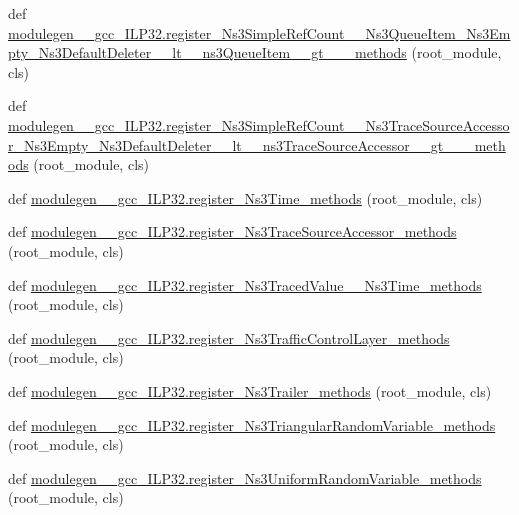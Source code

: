 \begin{DoxyCompactItemize}
\item 
def \hyperlink{namespacemodulegen____gcc__ILP32_a4e8d458b2fa0675e05a5b6c3d3966994}{modulegen\+\_\+\+\_\+gcc\+\_\+\+I\+L\+P32.\+register\+\_\+\+Ns3\+Simple\+Ref\+Count\+\_\+\+\_\+\+Ns3\+Queue\+Item\+\_\+\+Ns3\+Empty\+\_\+\+Ns3\+Default\+Deleter\+\_\+\+\_\+lt\+\_\+\+\_\+ns3\+Queue\+Item\+\_\+\+\_\+gt\+\_\+\+\_\+\+\_\+methods} (root\+\_\+module, cls)
\item 
def \hyperlink{namespacemodulegen____gcc__ILP32_a54ea4c3c62de90cf295c66cffbc336c8}{modulegen\+\_\+\+\_\+gcc\+\_\+\+I\+L\+P32.\+register\+\_\+\+Ns3\+Simple\+Ref\+Count\+\_\+\+\_\+\+Ns3\+Trace\+Source\+Accessor\+\_\+\+Ns3\+Empty\+\_\+\+Ns3\+Default\+Deleter\+\_\+\+\_\+lt\+\_\+\+\_\+ns3\+Trace\+Source\+Accessor\+\_\+\+\_\+gt\+\_\+\+\_\+\+\_\+methods} (root\+\_\+module, cls)
\item 
def \hyperlink{namespacemodulegen____gcc__ILP32_a4bcbbf479533e8b6fb238739668fe36d}{modulegen\+\_\+\+\_\+gcc\+\_\+\+I\+L\+P32.\+register\+\_\+\+Ns3\+Time\+\_\+methods} (root\+\_\+module, cls)
\item 
def \hyperlink{namespacemodulegen____gcc__ILP32_a3451d08858386f1fa04131d165c83ba0}{modulegen\+\_\+\+\_\+gcc\+\_\+\+I\+L\+P32.\+register\+\_\+\+Ns3\+Trace\+Source\+Accessor\+\_\+methods} (root\+\_\+module, cls)
\item 
def \hyperlink{namespacemodulegen____gcc__ILP32_aebca020ef83fe9fb15c8a105197331b6}{modulegen\+\_\+\+\_\+gcc\+\_\+\+I\+L\+P32.\+register\+\_\+\+Ns3\+Traced\+Value\+\_\+\+\_\+\+Ns3\+Time\+\_\+methods} (root\+\_\+module, cls)
\item 
def \hyperlink{namespacemodulegen____gcc__ILP32_adbf8cb1883f27c82c32ec73aca9e9932}{modulegen\+\_\+\+\_\+gcc\+\_\+\+I\+L\+P32.\+register\+\_\+\+Ns3\+Traffic\+Control\+Layer\+\_\+methods} (root\+\_\+module, cls)
\item 
def \hyperlink{namespacemodulegen____gcc__ILP32_a7be1ac5e0e1a8ec544474f384e1642fc}{modulegen\+\_\+\+\_\+gcc\+\_\+\+I\+L\+P32.\+register\+\_\+\+Ns3\+Trailer\+\_\+methods} (root\+\_\+module, cls)
\item 
def \hyperlink{namespacemodulegen____gcc__ILP32_a56825f84f5a3f31c90087d3a4c1d8c0b}{modulegen\+\_\+\+\_\+gcc\+\_\+\+I\+L\+P32.\+register\+\_\+\+Ns3\+Triangular\+Random\+Variable\+\_\+methods} (root\+\_\+module, cls)
\item 
def \hyperlink{namespacemodulegen____gcc__ILP32_a5465d181d936c13f0d7dd97daae33da0}{modulegen\+\_\+\+\_\+gcc\+\_\+\+I\+L\+P32.\+register\+\_\+\+Ns3\+Uniform\+Random\+Variable\+\_\+methods} (root\+\_\+module, cls)

\end{DoxyCompactItemize}
